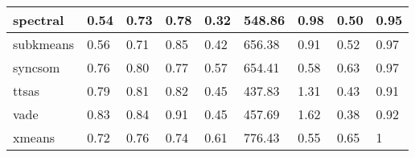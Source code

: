 \begin{table}[H]
\begin{tabular}{|l|l|l|l|l|l|l|l|l|}
\hline
spectral & 0.54 & 0.73 & 0.78 & 0.32 & 548.86 & 0.98 & 0.50 & 0.95 \\
\hline
subkmeans & 0.56 & 0.71 & 0.85 & 0.42 & 656.38 & 0.91 & 0.52 & 0.97 \\
\hline
syncsom & 0.76 & 0.80 & 0.77 & 0.57 & 654.41 & 0.58 & 0.63 & 0.97 \\
\hline
ttsas & 0.79 & 0.81 & 0.82 & 0.45 & 437.83 & 1.31 & 0.43 & 0.91 \\
\hline
vade & 0.83 & 0.84 & 0.91 & 0.45 & 457.69 & 1.62 & 0.38 & 0.92 \\
\hline
xmeans & 0.72 & 0.76 & 0.74 & 0.61 & 776.43 & 0.55 & 0.65 & 1 \\
\hline
\end{tabular}
\end{table}



